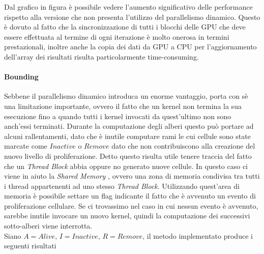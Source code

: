 \begin{figure}[H]
    \centering
    \caption{}
\end{figure}

Dal grafico in figura è possibile vedere l'aumento significativo delle
performance rispetto alla versione che non presenta l'utilizzo del
parallelismo dinamico. Questo è dovuto al fatto che la sincronizzazione
di tutti i blocchi delle GPU che deve essere effettuata al termine di ogni
iterazione è molto onerosa in termini prestazionali, inoltre anche la copia
dei dati da GPU a CPU per l'aggiornamento dell'array dei risultati risulta
particolarmente time-consuming.

\paragraph{Bounding}

Sebbene il parallelismo dinamico introduca un enorme vantaggio, porta con sè
una limitazione importante, ovvero il fatto che un kernel non termina la sua
esecuzione fino a quando tutti i kernel invocati da quest'ultimo non sono
anch'essi terminati. Durante la computazione degli alberi questo può portare
ad alcuni rallentamenti, dato che è inutile computare rami le cui cellule
sono state marcate come $Inactive$ o $Remove$ dato che non contribuiscono
alla creazione del nuovo livello di proliferazione.
Detto questo risulta utile tenere traccia del fatto che un \textit{Thread Block}
abbia oppure no generato nuove cellule.
In questo caso ci viene in aiuto la \textit{Shared Memory}\cite{sanders2010cuda}
, ovvero una zona di memoria condivisa tra tutti i thread appartenenti ad
uno stesso \textit{Thread Block}. Utilizzando quest'area di memoria è possibile
settare un flag indicante il fatto che è avvenuto un evento di proliferazione
cellulare. Se ci trovassimo nel caso in cui nessun evento è avvenuto, sarebbe
inutile invocare un nuovo kernel, quindi la computazione dei successivi
sotto-alberi viene interrotta.
\\
Siano $A = Alive$, $I = Inactive$, $R = Remove$, il metodo implementato
produce i seguenti risultati

